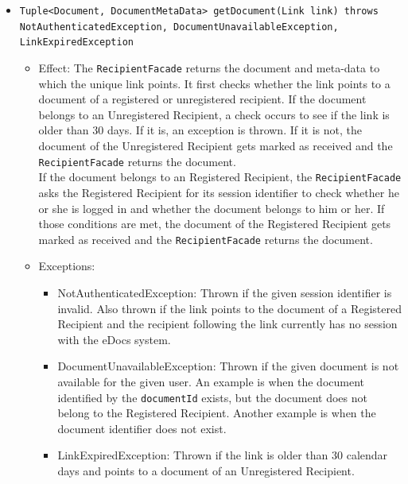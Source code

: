 \documentclass[a4paper,10pt]{article}
\begin{document}
\begin{itemize}
\begin{itemize}
      \item \texttt{Tuple<Document, DocumentMetaData> getDocument(Link link) throws NotAuthenticatedException, DocumentUnavailableException, LinkExpiredException}  
        \begin{itemize}
            \item Effect: The \texttt{RecipientFacade} returns the document and meta-data to which the unique link points. It first checks whether the link points to a document of a registered or unregistered recipient. If the document belongs to  an Unregistered Recipient, a check occurs to see if the link is older than 30 days. If it is, an exception is thrown. If it is not, the document of the Unregistered Recipient gets marked as received and the \texttt{RecipientFacade} returns the document. \\ If the document belongs to an Registered Recipient, the \texttt{RecipientFacade} asks the Registered Recipient for its session identifier to check whether he or she is logged in and whether the document belongs to him or  her. If those conditions are met, the document of the Registered Recipient gets marked as received and the \texttt{RecipientFacade} returns the document.
            \item Exceptions:
             \begin{itemize}
                \item NotAuthenticatedException: Thrown if the given session identifier is invalid. Also thrown if the link points to the document of a Registered Recipient and the recipient following the link currently has no session with the eDocs system.
                \item DocumentUnavailableException: Thrown if the given document is not available for the given user. An example is when the document identified by the \texttt{documentId} exists, but the document does not belong to the Registered Recipient. Another example is when the document identifier does not exist.
                \item LinkExpiredException: Thrown if the link is older than 30 calendar days and points to a document of an Unregistered Recipient.
            \end{itemize}       	
        \end{itemize}  
  
                
    \end{itemize}
\end{itemize}
\end{document}
